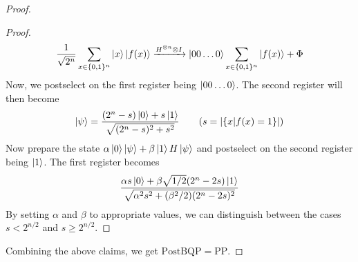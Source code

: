 \documentclass[../main.tex]{subfiles}
\begin{document}
\begin{proof}
\begin{proof}
\begin{equation*}
			\frac{1}{\sqrt{2^n}}\sum_{x\in\{0,1\}^n}\ket{x}\ket{f(x)} \xrightarrow{H^{\otimes n}\otimes I} \ket{00\hdots 0}\sum_{x\in \{0,1\}^n}\ket{f(x)} + \Phi
		\end{equation*}
		\noindent Now, we postselect on the first register being $\ket{00\hdots 0}$. The second register will then become
		\begin{equation*}
			\ket{\psi} = \frac{(2^n-s)\ket{0}+s\ket{1}}{\sqrt{(2^n-s)^2+s^2}}\tag{$s=|\{x|f(x)=1\}|$}
		\end{equation*}
		\noindent Now prepare the state $\alpha\ket{0}\ket{\psi}+\beta\ket{1}H\ket{\psi}$ and postselect on the second register being $\ket{1}$. The first register becomes
		\begin{equation*}
			\frac{\alpha s\ket{0}+\beta\sqrt{1/2}(2^n-2s)\ket{1}}{\sqrt{\alpha^2s^2+(\beta^2/2)(2^n-2s)^2}}
		\end{equation*}
		\noindent By setting $\alpha$  and $\beta$ to appropriate values, we can distinguish between the cases $s<2^{n/2}$ and $s\ge 2^{n/2}$.
	\end{proof}
	\noindent Combining the above claims, we get $\mathrm{PostBQP} = \mathrm{PP}$.
\end{proof}
\end{document}
